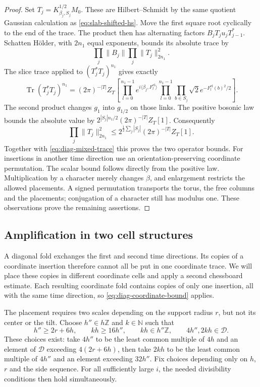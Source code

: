 \documentclass[11pt,letterpaper,reqno]{amsart}
\newcommand{\Z}{\mathbb Z}
\newcommand{\N}{\mathbb N}
\begin{document}
\begin{proof}
Set $T_j=K_{\beta_j,S_j}^{1/2}M_0$. These are
Hilbert--Schmidt by the same quotient Gaussian calculation as
\eqref{eq:slab-shifted-hs}. Move the first square root cyclically
to the end of the trace. The product then has alternating factors
$B_jT_ju_jT_{j-1}^*$. Schatten H\"older, with $2n_1$ equal
exponents, bounds its absolute trace by
\[
 \prod_j\|B_j\|\prod_j\|T_j\|_{2n_1}^2.
\]
The slice trace applied to $(T_j^*T_j)^{n_1}$ gives exactly
\begin{equation}\label{eq:diag-variance-trace}
 \operatorname{Tr}(T_j^*T_j)^{n_1}
 =(2\pi)^{-|T|}Z_T\left[
    \prod_{l=0}^{n_1-1}e^{i\langle\beta_j,F_l^{\mathrm{el}}\rangle}
    \prod_{l=0}^{n_1-1}\prod_{b\in S_j}
                     \sqrt2e^{-F_l^{\mathrm{el}}(b)^2/2}\right].
\end{equation}
The second product changes $g_1$ into $g_{1/2}$ on those links.
The positive bosonic law bounds the absolute value by
$2^{|S_j|n_1/2}(2\pi)^{-|T|}Z_T[1]$. Consequently
\[
 \prod_j\|T_j\|_{2n_1}^2
 \le 2^{\frac12\sum_j|S_j|}(2\pi)^{-|T|}Z_T[1].
\]
Together with \eqref{eq:diag-mixed-trace} this proves the two
operator bounds. For insertions in another time direction use
an orientation-preserving coordinate permutation. The scalar
bound follows directly from the positive law. Multiplication by
a character merely changes $\beta$, and enlargement restricts
the allowed placements. A signed permutation transports the
torus, the free columns and the placements; conjugation of a
character still has modulus one. These observations prove the
remaining assertions.
\end{proof}

\subsection{Amplification in two cell structures}\label{subsec:diag-amplification}

A diagonal fold exchanges the first and second time directions.
Its copies of a coordinate insertion therefore cannot all be put
in one coordinate trace. We will place these copies in different
coordinate cells and apply a second chessboard estimate. Each
resulting coordinate fold contains copies of only one insertion,
all with the same time direction, so
\eqref{eq:diag-coordinate-bound} applies.

The placement requires two scales depending on the support radius
$r$, but not its center or the tilt. Choose $h''\in h\Z$ and
$k\in\N$ such that
\begin{equation}\label{eq:diag-coarse-widths}
 h''\ge2r+6h,\qquad kh\ge16h'',\qquad
 kh\in h''\Z,\qquad4h'',2kh\in\mathcal D.
\end{equation}
These choices exist: take $4h''$ to be the least common multiple
of $4h$ and an element of $\mathcal D$ exceeding $4(2r+6h)$,
then take $2kh$ to be the least common multiple of $4h''$ and an
element exceeding $32h''$. Fix choices depending only on $h$, $r$
and the side sequence. For all sufficiently large $i$, the needed
divisibility conditions then hold simultaneously.
\end{document}
